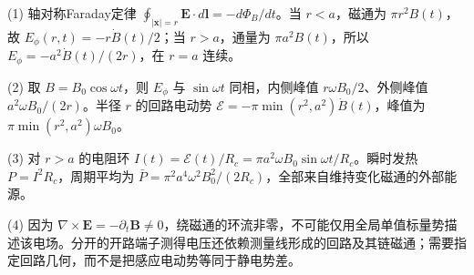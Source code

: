 (1) 轴对称Faraday定律 \(\oint_{|\mathbf x|=r}\mathbf E\cdot d\mathbf l=-d\Phi_B/dt\)。当 \(r<a\)，磁通为 \(\pi r^2B(t)\)，故 \(\boxed{E_\phi(r,t)=-r\dot B(t)/2}\)；当 \(r>a\)，通量为 \(\pi a^2B(t)\)，所以 \(\boxed{E_\phi=-a^2\dot B(t)/(2r)}\)，在 \(r=a\) 连续。

(2) 取 \(B=B_0\cos\omega t\)，则 \(E_\phi\) 与 \(\sin\omega t\) 同相，内侧峰值 \(r\omega B_0/2\)、外侧峰值 \(a^2\omega B_0/(2r)\)。半径 \(r\) 的回路电动势 \(\mathcal E=-\pi\min(r^2,a^2)\dot B(t)\)，峰值为 \(\pi\min(r^2,a^2)\omega B_0\)。

(3) 对 \(r>a\) 的电阻环 \(I(t)=\mathcal E(t)/R_c=\pi a^2\omega B_0\sin\omega t/R_c\)。瞬时发热 \(P=I^2R_c\)，周期平均为 \(\boxed{\bar P=\pi^2a^4\omega^2B_0^2/(2R_c)}\)，全部来自维持变化磁通的外部能源。

(4) 因为 \(\nabla\times\mathbf E=-\partial_t\mathbf B\ne0\)，绕磁通的环流非零，不可能仅用全局单值标量势描述该电场。分开的开路端子测得电压还依赖测量线形成的回路及其链磁通；需要指定回路几何，而不是把感应电动势等同于静电势差。
